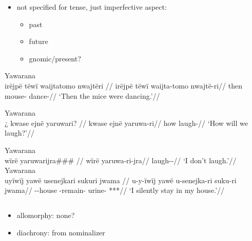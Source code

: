 \documentclass{memoir}
\begin{document}
\begin{itemize}
\tightlist
\item
  not specified for tense, just imperfective aspect:

  \begin{itemize}
  \tightlist
  \item
    past 
  \item
    future 
  \item
    gnomic/present? 
  \end{itemize}
\end{itemize}

\ex Yawarana \\
\label{ctorat-16}    \begingl
    \glpreamble  irëjpë tëwï waijtatomo nwajtëri //
    \gla irëjpë tëwï waijta-tomo nwajtë-ri//
    \glb then  mouse- dance-//
        \glft ‘Then the mice were dancing.’//  
    \endgl 
\xe

\ex Yawarana \\
\label{convrisamaj-06}    \begingl
    \glpreamble ¿ kwase ejnë yaruwari? //
    \gla kwase ejnë yaruwa-ri//
    \glb how  laugh-//
        \glft ‘How will we laugh?’//  
    \endgl 
\xe

\pex\label{gnomicri}    \a Yawarana\\
    \label{convrisamaj-04}        \begingl
        \glpreamble  wïrë yaruwarijra\#\#\# //
        \gla wïrë yaruwa-ri-jra//
        \glb {} laugh--//
            \glft ‘I don’t laugh.’//  
        \endgl 
    \a Yawarana\\
    \label{convrisamaj-28}        \begingl
        \glpreamble  uyïwïj yawë usenejkari sukuri jwama //
        \gla u-y-ïwïj yawë u-senejka-ri suku-ri jwama//
        \glb {}--house  -remain- urine- ***//
            \glft ‘I silently stay in my house.’//  
        \endgl 
\xe

\subsection{\texorpdfstring{}{}}

\begin{itemize}
\tightlist
\item
  allomorphy: none?
\item
  diachrony: from nominalizer 
\end{itemize}
\end{document}
